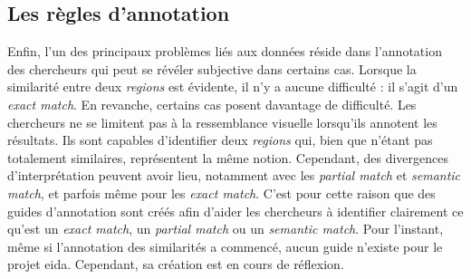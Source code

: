 \subsection{Les règles d'annotation}

Enfin, l'un des principaux problèmes liés aux données réside dans l'annotation des chercheurs qui peut se révéler subjective dans certains cas. Lorsque la similarité entre deux \textit{regions} est évidente, il n'y a aucune difficulté : il s'agit d'un \textit{exact match}. En revanche, certains cas posent davantage de difficulté. Les chercheurs ne se limitent pas à la ressemblance visuelle lorsqu'ils annotent les résultats. Ils sont capables d'identifier deux \textit{regions} qui, bien que n'étant pas totalement similaires, représentent la même notion. Cependant, des divergences d'interprétation peuvent avoir lieu, notamment avec les \textit{partial match} et \textit{semantic match}, et parfois même pour les \textit{exact match}. C'est pour cette raison que des guides d'annotation sont créés afin d'aider les chercheurs à identifier clairement ce qu'est un \textit{exact match}, un \textit{partial match} ou un \textit{semantic match}. Pour l'instant, même si l'annotation des similarités a commencé, aucun guide n'existe pour le projet \gls{eida}. Cependant, sa création est en cours de réflexion.\\
